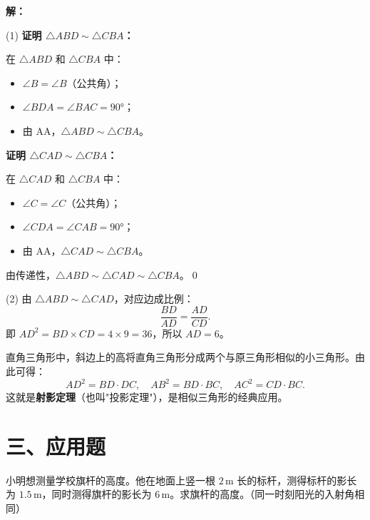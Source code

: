\documentclass[12pt, a4paper]{ctexart}
\begin{document}
\textbf{解：}

(1) \textbf{证明 $\triangle ABD\sim\triangle CBA$：}

在 $\triangle ABD$ 和 $\triangle CBA$ 中：
\begin{itemize}[nosep]
  \item $\angle B=\angle B$（公共角）；
  \item $\angle BDA=\angle BAC=90°$；
  \item 由 AA，$\triangle ABD\sim\triangle CBA$。
\end{itemize}

\textbf{证明 $\triangle CAD\sim\triangle CBA$：}

在 $\triangle CAD$ 和 $\triangle CBA$ 中：
\begin{itemize}[nosep]
  \item $\angle C=\angle C$（公共角）；
  \item $\angle CDA=\angle CAB=90°$；
  \item 由 AA，$\triangle CAD\sim\triangle CBA$。
\end{itemize}

由传递性，$\triangle ABD\sim\triangle CAD\sim\triangle CBA$。\qed

\medskip
(2) 由 $\triangle ABD\sim\triangle CAD$，对应边成比例：
\[
\frac{BD}{AD}=\frac{AD}{CD}.
\]
即 $AD^2=BD\times CD=4\times9=36$，所以 $AD=\boxed{6}$。

\begin{tipbox}[射影定理]
直角三角形中，斜边上的高将直角三角形分成两个与原三角形相似的小三角形。由此可得：
\[
AD^2=BD\cdot DC,\quad AB^2=BD\cdot BC,\quad AC^2=CD\cdot BC.
\]
这就是\textbf{射影定理}（也叫"投影定理"），是相似三角形的经典应用。
\end{tipbox}

\section*{\textcolor{apppurple}{三、应用题}}

\begin{appbox}[【应用1】利用影长测高]
小明想测量学校旗杆的高度。他在地面上竖一根 $2\,\text{m}$ 长的标杆，测得标杆的影长为 $1.5\,\text{m}$，同时测得旗杆的影长为 $6\,\text{m}$。求旗杆的高度。（同一时刻阳光的入射角相同）

\medskip
\begin{center}
\end{center}
\end{appbox}
\end{document}
